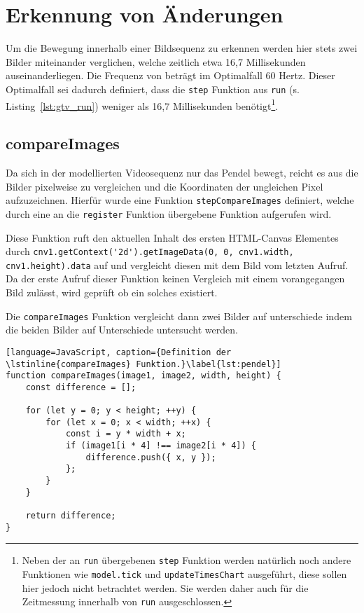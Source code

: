 \section{Erkennung von Änderungen} \label{ch:erkennung_von_änderungen}

Um die Bewegung innerhalb einer Bildsequenz zu erkennen werden hier stets zwei Bilder miteinander verglichen, welche zeitlich etwa 16,7 Millisekunden auseinanderliegen.
Die Frequenz von  beträgt im Optimalfall 60 Hertz.
Dieser Optimalfall sei dadurch definiert, dass die \lstinline{step} Funktion aus \lstinline{run} (s. Listing~\ref{lst:gtv_run}) weniger als 16,7 Millisekunden benötigt\footnote{Neben der an \lstinline{run} übergebenen \lstinline{step} Funktion werden natürlich noch andere Funktionen wie \lstinline{model.tick} und \lstinline{updateTimesChart} ausgeführt, diese sollen hier jedoch nicht betrachtet werden. Sie werden daher auch für die Zeitmessung innerhalb von \lstinline{run} ausgeschlossen.}.

\subsection{compareImages}

Da sich in der modellierten Videosequenz nur das Pendel bewegt, reicht es aus die Bilder pixelweise zu vergleichen und die Koordinaten der ungleichen Pixel aufzuzeichnen.
Hierfür wurde eine Funktion \lstinline{stepCompareImages} definiert, welche durch eine an die \lstinline{register} Funktion übergebene Funktion aufgerufen wird.

Diese Funktion ruft den aktuellen Inhalt des ersten HTML-Canvas Elementes durch \lstinline{cnv1.getContext('2d').getImageData(0, 0, cnv1.width, cnv1.height).data} auf und vergleicht diesen mit dem Bild vom letzten Aufruf.
Da der erste Aufruf dieser Funktion keinen Vergleich mit einem vorangegangen Bild zulässt, wird geprüft ob ein solches existiert.

Die \lstinline{compareImages} Funktion vergleicht dann zwei Bilder auf unterschiede indem die beiden Bilder auf Unterschiede untersucht werden.

\begin{lstlisting}[language=JavaScript, caption={Definition der \lstinline{compareImages} Funktion.}\label{lst:pendel}]
function compareImages(image1, image2, width, height) {
    const difference = [];

    for (let y = 0; y < height; ++y) {
        for (let x = 0; x < width; ++x) {
            const i = y * width + x;
            if (image1[i * 4] !== image2[i * 4]) {
                difference.push({ x, y });
            };
        }
    }

    return difference;
}
\end{lstlisting}

